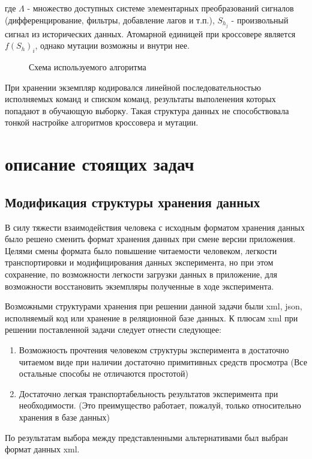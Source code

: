 \documentclass[utf8,usehyperref,12pt]{G7-32}
\begin{document}
где $\Lambda$ - множество доступных системе элементарных преобразований сигналов (дифференцирование, фильтры, добавление лагов и т.п.), $S_{h_{j}}$ - произвольный сигнал из исторических данных. Атомарной единицей при кроссовере является $f(S_{h})_{i}$, однако мутации возможны и внутри нее.\\
\begin{figure}[H]
 \caption{Схема используемого алгоритма}\label{algo}
\end{figure}

При хранении экземпляр кодировался линейной последовательностью исполняемых команд и списком команд, результаты выполенения которых попадают в обучающую выборку. Такая структура данных не способствовала тонкой настройке алгоритмов кроссовера и мутации.
\section{описание стоящих задач}
\subsection{Модификация структуры хранения данных}
В силу тяжести взаимодействия человека с исходным форматом хранения данных было решено сменить формат хранения данных при смене версии приложения. Целями смены формата было повышение читаемости человеком, легкости транспортировки и модифицирования данных эксперимента, но при этом сохранение, по возможности легкости загрузки данных в приложение, для возможности восстановить экземпляры полученные в ходе эксперимента.

Возможными структурами хранения при решении данной задачи были xml, json, исполняемый код или хранение в реляционной базе данных. К плюсам xml при решении поставленной задачи следует отнести следующее:
\begin{enumerate}
\item Возможность прочтения человеком структуры эксперимента в достаточно читаемом виде при наличии достаточно примитивных средств просмотра (Все остальные способы не отличаются простотой)
\item Достаточно легкая транспортабельность результатов эксперимента при необходимости. (Это преимущество работает, пожалуй, только относительно хранения в базе данных)
\end{enumerate}
По результатам выбора между представленными альтернативами был выбран формат данных xml.
\end{document}
